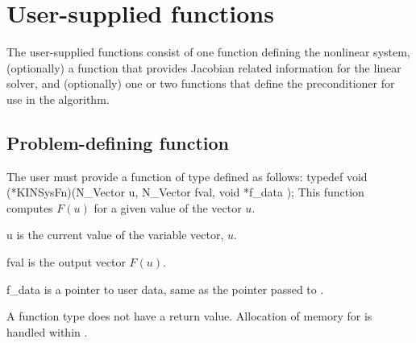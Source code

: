 \section{User-supplied functions}\label{ss:user_fct_sol}

The user-supplied functions consist of one function defining the nonlinear system, 
(optionally) a function that provides Jacobian related information for the linear
solver, and (optionally) one or two functions that define the preconditioner for 
use in the {\spgmr} algorithm. 

\subsection{Problem-defining function} \label{ss:sysFn}

The user must provide a function of type  defined as follows:
{
  typedef void (*KINSysFn)(N\_Vector u, N\_Vector fval, void *f\_data );
}
{
  This function computes $F(u)$ for a given value of the vector $u$.
}
{
  \begin{args}[f\_data]
  \item[u]
    is the current value of the variable vector, $u$.
  \item[fval]
    is the output vector $F(u)$.
  \item[f\_data]
    is a pointer to user data, same as the pointer       
    passed to .   
  \end{args}
}
{
  A  function type does not have a return value.
}
{
Allocation of memory for  is handled within {\kinsol}.
}



